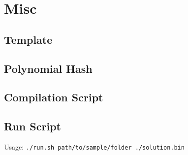 \documentclass{article}
\begin{document}
\section*{Misc}

\subsection*{Template}


\subsection*{Polynomial Hash}


\subsection*{Compilation Script}


\subsection*{Run Script}
Usage: \lstinline{./run.sh path/to/sample/folder ./solution.bin}

\end{document}

